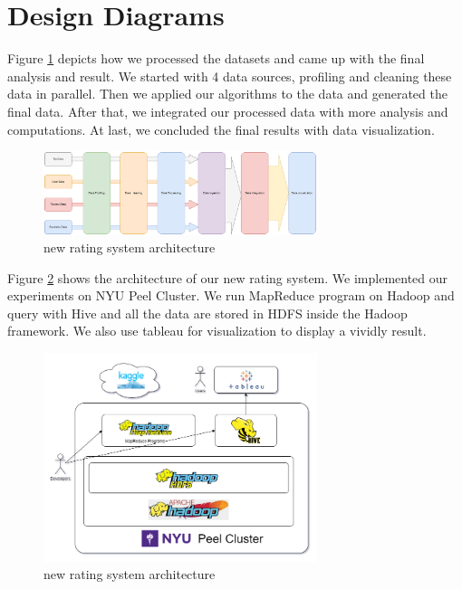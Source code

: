\documentclass{stylefiles/capstone}
\begin{document}
\section{Design Diagrams}
Figure \ref{process_diagram} depicts how we processed the datasets and came up with the final analysis and result. We started with 4 data sources, profiling and cleaning these data in parallel. Then we applied our algorithms to the data and generated the final data. After that, we integrated our processed data with more analysis and computations. At last, we concluded the final results with data visualization.
\begin{figure}[htp]
    \centering
    \includegraphics[width=8cm]{asset/Design diagrams-Design Diagram.drawio.png}
    \caption{new rating system architecture}
    \label{process_diagram}
\end{figure}
Figure \ref{system archi} shows the architecture of our new rating system. We implemented our experiments on NYU Peel Cluster. We run MapReduce program on Hadoop and query with Hive and all the data are stored in HDFS inside the Hadoop framework. We also use tableau for visualization to display a vividly result.
\begin{figure}[htp]
    \centering
    \includegraphics[width=8cm]{asset/Design diagrams-Software Architecture.drawio.png}
    \caption{new rating system architecture}
    \label{system archi}
\end{figure}
\end{document}
